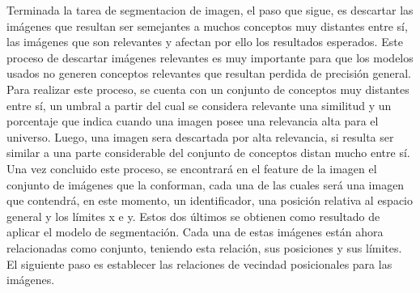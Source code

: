 Terminada la tarea de segmentacion de imagen, el paso que sigue, es descartar las imágenes que resultan ser semejantes a muchos conceptos muy distantes entre sí, las imágenes que son relevantes y afectan por ello los resultados esperados. Este proceso de descartar imágenes relevantes es muy importante para que los modelos usados no generen conceptos relevantes que resultan perdida de precisi\'on general. Para realizar este proceso, se cuenta con un conjunto de conceptos muy distantes entre sí, un umbral a partir del cual se considera relevante una similitud y un porcentaje que indica cuando una imagen posee una relevancia alta para el universo. Luego, una imagen sera descartada por alta relevancia, si resulta ser similar a una parte considerable del conjunto de conceptos distan mucho entre s\'i.
Una vez concluido este proceso, se encontrará en el feature de la imagen el conjunto de imágenes que la conforman, cada una de las cuales será una imagen que contendrá, en este momento, un identificador, una posición relativa al espacio general y los límites x e y. Estos dos últimos se obtienen como resultado de aplicar el modelo de segmentación. Cada una de estas imágenes están ahora relacionadas como conjunto, teniendo esta relación, sus posiciones y sus límites. El siguiente paso es establecer las relaciones de vecindad posicionales para las imágenes.

